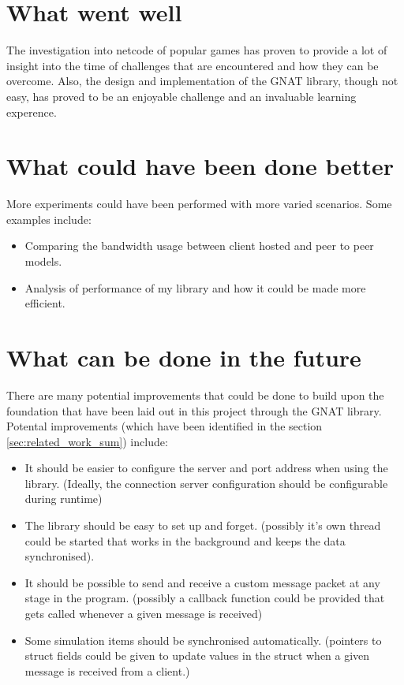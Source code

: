 \section{What went well}
The investigation into netcode of popular games has proven to provide a lot of insight into the time of challenges that are encountered and how they can be overcome. Also, the design and implementation of the GNAT library, though not easy, has proved to be an enjoyable challenge and an invaluable learning experence.


\section{What could have been done better}
More experiments could have been performed with more varied scenarios. Some examples include:
\begin{itemize}
\item Comparing the bandwidth usage between client hosted and peer to peer models.
\item Analysis of performance of my library and how it could be made more efficient.
\end{itemize}


\section{What can be done in the future}
There are many potential improvements that could be done to build upon the foundation that have been laid out in this project through the GNAT library. Potental improvements (which have been identified in the section \ref{sec:related_work_sum}) include:
\begin{itemize}
\item It should be easier to configure the server and port address when using the library. (Ideally, the connection server configuration should be configurable during runtime)
\item The library should be easy to set up and forget. (possibly it's own thread could be started that works in the background and keeps the data synchronised).
\item It should be possible to send and receive a custom message packet at any stage in the program. (possibly a callback function could be provided that gets called whenever a given message is received)
\item Some simulation items should be synchronised automatically. (pointers to struct fields could be given to update values in the struct when a given message is received from a client.)
\end{itemize}
